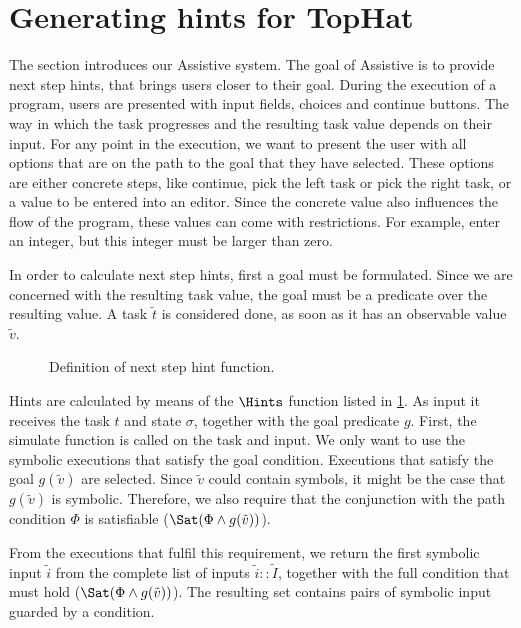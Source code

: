 
\section{Generating hints for TopHat}
\label{sec:assistive}
The section introduces our Assistive \TOPHAT system.
The goal of Assistive \TOPHAT is to provide next step hints, that brings users closer to their goal.
During the execution of a \TOPHAT program, users are presented with input fields, choices and continue buttons.
The way in which the task progresses and the resulting task value depends on their input.
For any point in the execution, we want to present the user with all options that are on the path to the goal that they have selected.
These options are either concrete steps, like continue, pick the left task or pick the right task,
or a value to be entered into an editor.
Since the concrete value also influences the flow of the program, these values can come with restrictions.
For example, enter an integer, but this integer must be larger than zero.


In order to calculate next step hints, first a goal must be formulated.
Since we are concerned with the resulting task value, the goal must be a predicate over the resulting value.
A task $\tilde{t}$ is considered done, as soon as it has an observable value $\tilde{v}$.

\begin{figure}
  \caption{Definition of next step hint function.}
  \label{fig:hints}
\end{figure}


Hints are calculated by means of the $\Hints$ function listed in \cref{fig:hints}.
As input it receives the task $t$ and state $\sigma$, together with the goal predicate $g$.
First, the simulate function is called on the task and input.
We only want to use the symbolic executions that satisfy the goal condition.
Executions that satisfy the goal $g(\tilde{v})$ are selected.
Since $\tilde{v}$ could contain symbols, it might be the case that $g(\tilde{v})$ is symbolic.
Therefore, we also require that the conjunction with the path condition $\Phi$ is satisfiable ($\Sat(\Phi\land g(\tilde{v}))$).

From the executions that fulfil this requirement, we return the first symbolic input $\tilde{i}$ from the complete list of inputs $\tilde{i}::\tilde{I}$,
together with the full condition that must hold ($\Sat(\Phi\land g(\tilde{v}))$).
The resulting set contains pairs of symbolic input guarded by a condition.

